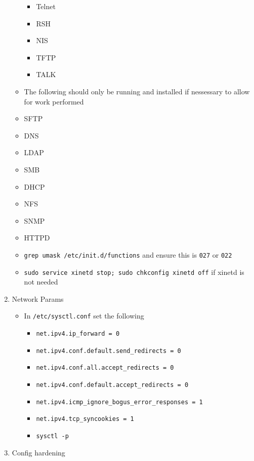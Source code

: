 \documentclass[12pt, letterpaper,oneocolumn]{article}
\begin{document}
\begin{appendices}
\begin{enumerate}
\begin{itemize}
    \begin{itemize}
    \item
      Telnet
    \item
      RSH
    \item
      NIS
    \item
      TFTP
    \item
      TALK
    \end{itemize}
  \item
    The following should only be running and installed if nessessary to
    allow for work performed
  \item
    SFTP
  \item
    DNS
  \item
    LDAP
  \item
    SMB
  \item
    DHCP
  \item
    NFS
  \item
    SNMP
  \item
    HTTPD
  \item
    \texttt{grep\ umask\ /etc/init.d/functions} and ensure this is
    \texttt{027} or \texttt{022}
  \item
    \texttt{sudo\ service\ xinetd\ stop;\ sudo\ chkconfig\ xinetd\ off}
    if xinetd is not needed
  \end{itemize}
\item
  Network Params

  \begin{itemize}
  \item
    In \texttt{/etc/sysctl.conf} set the following

    \begin{itemize}
    \item
      \texttt{net.ipv4.ip\_forward\ =\ 0}
    \item
      \texttt{net.ipv4.conf.default.send\_redirects\ =\ 0}
    \item
      \texttt{net.ipv4.conf.all.accept\_redirects\ =\ 0}
    \item
      \texttt{net.ipv4.conf.default.accept\_redirects\ =\ 0}
    \item
      \texttt{net.ipv4.icmp\_ignore\_bogus\_error\_responses\ =\ 1}
    \item
      \texttt{net.ipv4.tcp\_syncookies\ =\ 1}
    \item
      \texttt{sysctl\ -p}
    \end{itemize}
  \end{itemize}
\item
  Config hardening


\end{enumerate}
\end{appendices}
\end{document}
